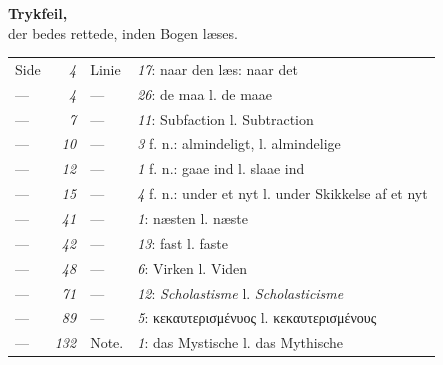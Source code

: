 \documentclass[12pt]{book}
\begin{document}
\begin{center}
{\large\bfseries Trykfeil,}\\[0.4\baselineskip]
der bedes rettede, inden Bogen læses.
\end{center}
\medskip

\begin{center}
\begin{tabular}{@{}l@{~}r@{~}l@{~}l@{}}
Side & \textit{4}   & Linie & \textit{17}: naar den læs: naar det\\
---  & \textit{4}   & ---   & \textit{26}: de maa l. de maae\\
---  & \textit{7}   & ---   & \textit{11}: Subfaction l. Subtraction\\
---  & \textit{10}  & ---   & \textit{3} f. n.: almindeligt, l. almindelige\\
---  & \textit{12}  & ---   & \textit{1} f. n.: gaae ind l. slaae ind\\
---  & \textit{15}  & ---   & \textit{4} f. n.: under et nyt l. under Skikkelse af et nyt\\
---  & \textit{41}  & ---   & \textit{1}: næsten l. næste\\
---  & \textit{42}  & ---   & \textit{13}: fast l. faste\\
---  & \textit{48}  & ---   & \textit{6}: Virken l. Viden\\
---  & \textit{71}  & ---   & \textit{12}: \emph{Scholastisme} l. \emph{Scholasticisme}\\
---  & \textit{89}  & ---   & \textit{5}: κεκαυτερισμένυος l. κεκαυτερισμένους\\
---  & \textit{132} & Note. & \textit{1}: das Mystische l. das Mythische
\end{tabular}
\end{center}

\mainmatter

\end{document}
